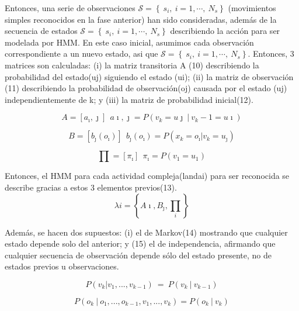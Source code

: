 \documentclass{article}
\begin{document}
Entonces, una serie de observaciones $\mathcal{S} =  \left\lbrace \ s_i,\ i=1,\cdots , \ N_s \right\rbrace$ (movimientos simples reconocidos en la fase anterior) han sido consideradas, además de la secuencia de estados  $\mathcal{S} =  \left\lbrace \ s_i,\ i=1,\cdots , \ N_s \right\rbrace$ describiendo la acción para ser modelada por HMM. En este caso inicial, asumimos cada observación correspondiente a un nuevo estado, asi que  $\mathcal{S} =  \left\lbrace \ s_i,\ i=1,\cdots , \ N_s \right\rbrace$. Entonces, 3 matrices son calculadas: (i) la matriz transitoria A (10) describiendo la probabilidad del estado(uj) siguiendo el estado (ui); (ii) la matriz de observación (11) describiendo la probabilidad de observación(oj) causada por el estado (uj) independientemente de k; y (iii) la matriz de probabilidad inicial(12).

\begin{equation}A  =\left[a_\imath ,\jmath \right] \ \ a\imath ,\jmath = P\left(v_k = u\jmath \ | \ v_k-1 = u\imath  \right)\end{equation}

\begin{equation}B  =\left[b_\jmath \left(o_\imath \right)  \right] \ \ b_\jmath \left(o_\imath \right)  = P\left(x_k = o_\imath | v_k = u_\jmath  \right)  \end{equation}

\begin{equation}\prod =\left[\pi_\imath \right] \ \ \pi_\imath = P\left(v_1= u_1\right)  \end{equation}

Entonces, el HMM para cada actividad compleja(landai) para ser reconocida se describe gracias a estos 3 elementos previos(13).
\begin{equation}\lambda i=\left\{A\imath ,B_\jmath ,\prod_i  \right\}\end{equation}

Además, se hacen dos supuestos: (i) el de Markov(14) mostrando que cualquier estado depende solo del anterior; y (15) el de independencia, afirmando que cualquier secuencia de observación depende sólo del estado presente, no de estados previos u observaciones.


\begin{equation} P\left(v_k | v_1, ... , v_{k-1}\right) \ = \ P\left(v_k \ | \ v_{k-1}\right)  \end{equation}

\begin{equation}P\left(o_k \ | \ o_1, ..., o_{k-1}, v_1,...,v_k\right) = P\left(o_k \ | \  v_k\right)\end{equation}
\end{document}

